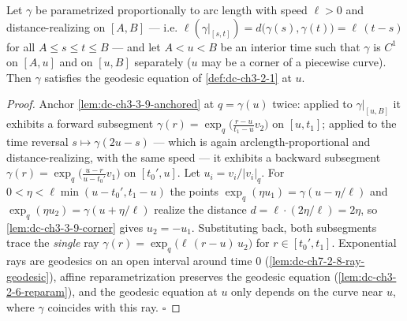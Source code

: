 \begin{lemma}
  \label{lem:dc-ch3-3-9-localization}
  \leanok
  Let $\gamma$ be parametrized proportionally to arc length with speed
  $\ell>0$ and distance-realizing on $[A,B]$ — i.e.
  $\ell(\gamma|_{[s,t]})=d\big(\gamma(s),\gamma(t)\big)=\ell\,(t-s)$ for all
  $A\le s\le t\le B$ — and let $A<u<B$ be an interior time such that
  $\gamma$ is $C^1$ on $[A,u]$ and on $[u,B]$ separately ($u$ may be a corner
  of a piecewise curve). Then $\gamma$ satisfies the geodesic equation of
  \cref{def:dc-ch3-2-1} at $u$.
\end{lemma}
\begin{proof}
  \leanok
  Anchor \cref{lem:dc-ch3-3-9-anchored} at $q=\gamma(u)$ twice: applied to
  $\gamma|_{[u,B]}$ it exhibits a forward subsegment
  $\gamma(r)=\exp_q\big(\tfrac{r-u}{t_1-u}v_2\big)$ on $[u,t_1]$; applied to
  the time reversal $s\mapsto\gamma(2u-s)$ — which is again
  arclength-proportional and distance-realizing, with the same speed — it
  exhibits a backward subsegment
  $\gamma(r)=\exp_q\big(\tfrac{u-r}{u-t_0'}v_1\big)$ on $[t_0',u]$. Let
  $u_i=v_i/|v_i|_q$. For $0<\eta<\ell\min(u-t_0',t_1-u)$ the points
  $\exp_q(\eta u_1)=\gamma(u-\eta/\ell)$ and
  $\exp_q(\eta u_2)=\gamma(u+\eta/\ell)$ realize the distance
  $d=\ell\cdot(2\eta/\ell)=2\eta$, so \cref{lem:dc-ch3-3-9-corner} gives
  $u_2=-u_1$. Substituting back, both subsegments trace the \emph{single}
  ray $\gamma(r)=\exp_q\big(\ell\,(r-u)\,u_2\big)$ for
  $r\in[t_0',t_1]$. Exponential rays are geodesics on an open interval
  around time $0$ (\cref{lem:dc-ch7-2-8-ray-geodesic}), affine
  reparametrization preserves the geodesic equation
  (\cref{lem:dc-ch3-2-6-reparam}), and the geodesic equation at $u$ only
  depends on the curve near $u$, where $\gamma$ coincides with this ray.
  $\square$
\end{proof}

